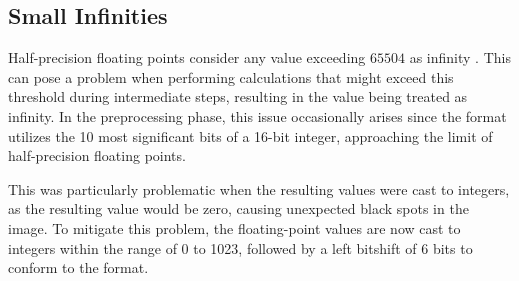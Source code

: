 \subsection{Small Infinities}

Half-precision floating points consider any value exceeding $65504$ as infinity \cite{HalfprecisionFloatingpointFormat2023}.
This can pose a problem when performing calculations that might exceed this threshold during intermediate steps, resulting in the value being treated as infinity.
In the preprocessing phase, this issue occasionally arises since the  format utilizes the 10 most significant bits of a 16-bit integer, approaching the limit of half-precision floating points.

This was particularly problematic when the resulting values were cast to integers, as the resulting value would be zero, causing unexpected black spots in the image.
To mitigate this problem, the floating-point values are now cast to integers within the range of 0 to 1023, followed by a left bitshift of 6 bits to conform to the  format.


